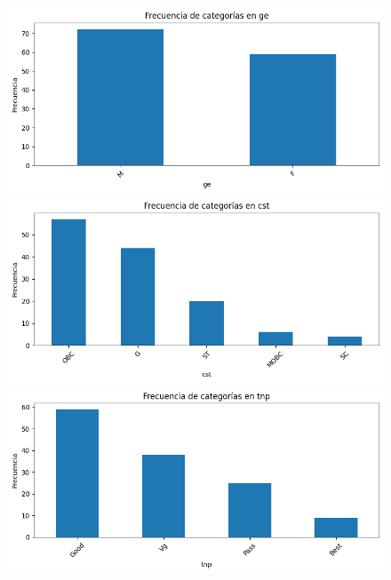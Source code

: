 \documentclass[11pt,a4paper]{article}
\begin{document}
\begin{figure}[H]
  \centering
  \begin{minipage}{0.32\textwidth}
    \includegraphics[width=\linewidth]{img/frecuencia_ge.png}
  \end{minipage}
  \hfill
  \begin{minipage}{0.32\textwidth}
    \includegraphics[width=\linewidth]{img/frecuencia_cst.png}
  \end{minipage}
  \hfill
  \begin{minipage}{0.32\textwidth}
    \includegraphics[width=\linewidth]{img/frecuencia_tnp.png}
  \end{minipage}


\end{figure}
\end{document}
